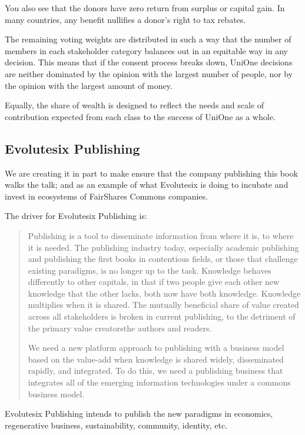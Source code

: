 You also see that the donors have zero return from surplus or capital gain. In many countries, any benefit nullifies a donor’s right to tax rebates.


The remaining voting weights are distributed in such a way that the number of members in each stakeholder category balances out in an equitable way in any decision. This means that if the consent process breaks down, UniOne decisions are neither dominated by the opinion with the largest number of people, nor by the opinion with the largest amount of money.


Equally, the share of wealth is designed to reflect the needs and scale of contribution expected from each class to the success of UniOne as a whole. 
\subsection{Evolutesix Publishing}
We are creating it in part to make ensure that the company publishing this book walks the talk; and as an example of what Evolutesix is doing to incubate and invest in ecosystems of FairShares Commons companies.


The driver for Evolutesix Publishing is:
\begin{quotation}
Publishing is a tool to disseminate information from where it is, to where it is needed. The publishing industry today, especially academic publishing and publishing the first books in contentious fields, or those that challenge existing paradigms, is no longer up to the task. Knowledge behaves differently to other capitals, in that if two people give each other new knowledge that the other lacks, both now have both knowledge. Knowledge multiplies when it is shared. The mutually beneficial share of value created across all stakeholders is broken in current publishing, to the detriment of the primary value creators\textemdash the authors and readers.


\noindent We need a new platform approach to publishing with a business model based on the value-add when knowledge is shared widely, disseminated rapidly, and integrated. To do this, we need a publishing business that integrates all of the emerging information technologies under a commons business model.
\end{quotation}


Evolutesix Publishing intends to publish the new paradigms in economics, regenerative business, sustainability, community, identity, etc. 


